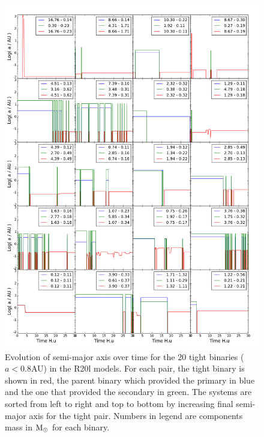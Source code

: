 \begin{figure}
\begin{center}
\includegraphics[width=\textwidth]{Figures/6_tights_origins}
\caption{Evolution of semi-major axis over time for the 20 tight binaries ($a < 0.8$AU) in the R20l models. For each pair, the tight binary is shown in red, the parent binary which provided the primary in blue and the one that provided the secondary in green. The systems are sorted from left to right and top to bottom by increasing final semi-major axis for the tight pair. Numbers in legend are components mass in ${\textrm{M}_\odot}$ for each binary.}
\label{Fig:6_origins}
\end{center}
\end{figure}


